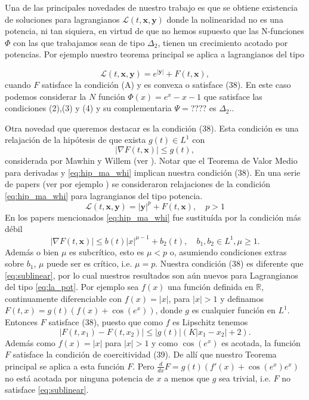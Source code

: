\documentclass[twoside]{elsarticle}
\theoremstyle{remark}
\renewcommand{\b}[1]{\boldsymbol{#1}}
\newcommand{\rr}{\mathbb{R}}
\renewcommand{\leq}{\leqslant}
\begin{document}
Una de las principales novedades de nuestro trabajo es que se obtiene existencia de soluciones para lagrangianos $\mathcal{L}(t,\b{x},\b{y})$ donde la nolinearidad no es una potencia, ni tan siquiera, en virtud de que no hemos supuesto que las N-funciones  $\Phi$ con las que trabajamos sean de tipo $\Delta_2$,  tienen un crecimiento acotado por potencias. Por ejemplo nuestro teorema principal se aplica a lagrangianos del tipo 
 
 \[\mathcal{L}(t,\b{x},\b{y})=e^{|\b{y}|}+F(t,\b{x}),\] 
cuando $F$ satisface la condición (A) y es convexa o satisface (38).  En este caso podemos considerar la $N$ función $\Phi(x)=e^x-x-1$ que satisface las condiciones (2),(3) y (4) y su complementaria $\Psi=$???? es $\Delta_2$.. 

Otra novedad que queremos destacar es la condición (38).  Esta condición es una relajación de la hipótesis de que exista $g(t)\in L^1$ con 
\begin{equation}\label{eq:hip_ma_whi}
  |\nabla F(t,\b{x})|\leq g(t),
\end{equation}
considerada por Mawhin y Willem (ver \cite[Th.1.5]{mawhin2010critical}).  Notar que el Teorema de Valor Medio para derivadas  y   \eqref{eq:hip_ma_whi} implican  nuestra condición (38). En una serie de papers (ver por ejemplo  \cite{wu1999periodic,zhao2004periodic,tang2010periodic}) se consideraron  relajaciones de la condición \eqref{eq:hip_ma_whi} para lagrangianos del tipo potencia.
 \begin{equation}\label{eq:la_pot}\mathcal{L}(t,\b{x},\b{y})=|\b{y}|^p+F(t,\b{x}),\quad p>1
 \end{equation}
 En los papers mencionados  \eqref{eq:hip_ma_whi} fue  sustituída por la condición más débil
 \begin{equation}\label{eq:sublinear}|\nabla F(t,\b{x})|\leq b(t)|x|^{\mu-1}+b_2(t),\quad b_1,b_2\in L^1, \mu\geq 1.
 \end{equation}
 Además o bien  $\mu$ es subcrítico, esto es  $\mu<p$ o, asumiendo condiciones extras  sobre $b_1$, $\mu$ puede ser es crítico, i.e. $\mu=p$.  Nuestra condición (38) es diferente que \eqref{eq:sublinear}, por lo cual nuestros resultados son aún nuevos para Lagrangianos del tipo \eqref{eq:la_pot}. Por ejemplo sea $f(x)$ una función definida en $\rr$, continuamente diferenciable con $f(x)=|x|$, para $|x|>1$ y definamos $F(t,x)=g(t)(f(x)+\cos(e^x))$, donde $g$ es cualquier función en $L^1$. Entonces $F$ satisface (38), puesto que como $f$ es Lipschitz tenemos
\[|F(t,x_1)-F(t,x_2)|\leq |g(t)|(K|x_1-x_2|+2).\]
Además como $f(x)=|x|$ para $|x|>1$ y como $\cos(e^x)$ es acotada, la función $F$ satisface la condición de coercitividad (39). De allí que nuestro Teorema principal se aplica a esta función $F$.  Pero $\frac{d}{dx}F=g(t)(f'(x)+\cos(e^x)e^x)$ no está acotada por ninguna potencia de $x$ a menos que $g$ sea trivial, i.e. $F$ no satisface \eqref{eq:sublinear}.
\end{document}
